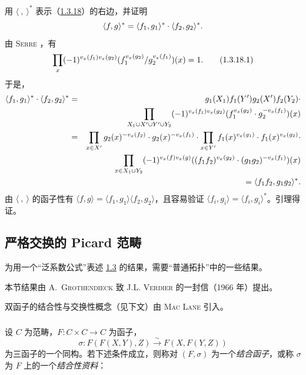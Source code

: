 用 $\langle~,~\rangle^{\ast}$ 表示（\hyperref[XVIII.lem1.3.18]{1.3.18}）的右边，并证明 $$ \langle f,g\rangle ^{\ast}=\langle f_{1},g_{1}\rangle ^{\ast}\cdot
\langle f_{2},g_{2}\rangle ^{\ast}{}.
$$ 由 \textsc{Serre} \cite[Ch.~III, prop.~6, p.~44]{sga4.exp.XVIII.bib.6}，有 \begin{equation*}
\prod_{x}(-1)^{v_{x}(f_{1})v_{x}(g_{2})}
(f_{1}^{v_{x}(g_{2})}/g_{2}^{v_{x}(f_{1})}) (x)=1{}.\tag{1.3.18.1}
\end{equation*} 于是，
\begin{eqnarray*}
\langle f_{1},g_{1}\rangle ^{\ast}\cdot \langle f_{2},g_{2}\rangle
^{\ast} &= &g_{1}(X_{1})f_{1}(Y')g_{2}(X')f_{2}(Y_{2})\cdot\\
& & \prod_{X_{1}\cup X'\cup Y'\cup Y_{2}}(-1)^{v_{x}(f_{1})v_{x}(g_{2})}
(f_{1}^{v_{x}(g_{2})}\cdot g_{2}^{-v_{x}(f_{1})})(x)\\
&=&\prod_{x\in X'} g_{2}(x)^{-v_{x}(f_{2})}\cdot
g_{2}(x)^{-v_{x}(f_{1})}\cdot \prod_{x\in
Y'}f_{1}(x)^{v_{x}(g_{1})}\cdot f_{1}(x)^{v_{x}(g_{2})}\cdot\\
&&\prod_{x\in X_{1}\cup Y_{2}}(-1)^{v_{x}(f)v_{x}(g)}
((f_{1}f_{2})^{v_{x}(g_{2})}\cdot
(g_{1}g_{2})^{-v_{x}(f_{1})})(x)\\
&&=\langle f_{1}f_{2},g_{1}g_{2}\rangle
^{\ast}{}. 
\end{eqnarray*} 由 $\langle~,~\rangle $ 的函子性\pageoriginale 有 $\langle f,g\rangle =\langle f_{1},g_{1}\rangle \langle
f_{2},g_{2}\rangle $，且容易验证 $\langle
f_{i},g_{i}\rangle =\langle f_{i},g_{i}\rangle ^{\ast}$。引理得证。

\subsection{严格交换的 Picard 范畴}

为用一个“泛系数公式”表述 \hyperref[XVIII.subsec1.3]{1.3} 的结果，需要“普通拓扑”中的一些结果。

本节结果由 A.~\textsc{Grothendieck} 致 J.L. \textsc{Verdier} 的一封信（1966 年）提出。

双函子的结合性与交换性概念（见下文）由 \textsc{Mac Lane} 引入。

\subsubsection{} 设 $C$ 为范畴，$F:C\times C\rightarrow C$ 为函子，$$
\sigma:F(F(X,Y),Z)\xrightarrow{\sim} F(X,F(Y,Z))
$$ 为三函子的一个同构。若下述条件成立，则称对 $(F,\sigma)$ 为一个\emph{结合函子}，或称 $\sigma$ 为 $F$ 上的一个\emph{结合性资料}：

